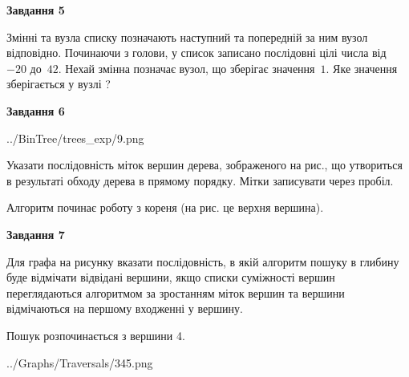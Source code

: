 \documentclass[12pt, ukrainian]{article}
\begin{document}
{\begin {large}
{\begin {center}\textbf{Завдання 5}\end {center}}\par
Змінні  та  вузла списку позначають наступний та попередній за ним вузол відповідно. Починаючи з голови, у список записано послідовні цілі числа від~$-20$ до~$42$. Нехай змінна  позначає вузол, що зберігає значення~$1$.
Яке значення зберігається у вузлі  ?\par
\newpage

{\begin {center}\textbf{Завдання 6}\end {center}}\par

\begin{center}
	{../BinTree/trees_exp/9.png}
\end{center}
Указати послідовність міток вершин дерева, зображеного на рис., що утвориться в результаті обходу дерева в прямому порядку. Мітки записувати через пробіл.\par Алгоритм починає роботу з кореня (на рис. це верхня вершина).\par
\newpage

{\begin {center}\textbf{Завдання 7}\end {center}}\par
Для графа на рисунку вказати послідовність, в якій алгоритм пошуку в глибину буде відмічати відвідані вершини, якщо списки суміжності вершин переглядаються алгоритмом за зростанням міток вершин та вершини відмічаються на першому вход\-женні у вершину.\par
Пошук розпочинається з вершини 4.\par

\begin{center}
	{../Graphs/Traversals/345.png}
\end{center}\par
\newpage


\end{large}}
\end{document}
